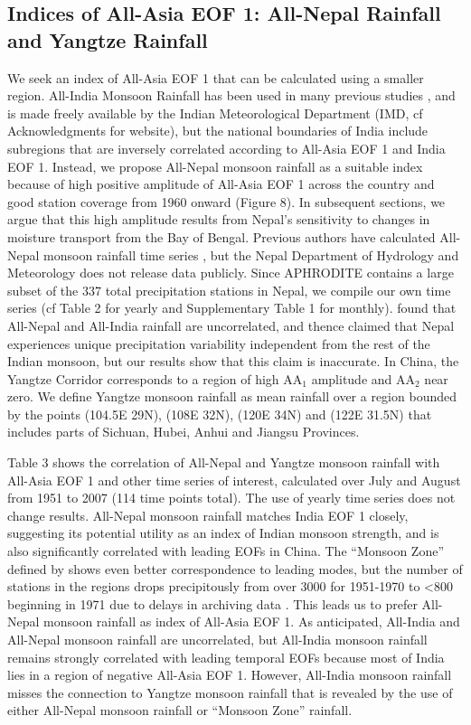 \documentclass[12pt]{article}
\begin{document}
 \subsection{Indices of All-Asia EOF 1: All-Nepal Rainfall and Yangtze Rainfall}
   
	We seek an index of All-Asia EOF 1 that can be calculated using a smaller region. All-India Monsoon Rainfall has been used in many previous studies \citep{Parthasarathy1994}, and is made freely available by the Indian Meteorological Department (IMD, cf Acknowledgments for website), but the national boundaries of India include subregions that are inversely correlated according to All-Asia EOF 1 and India EOF 1. Instead, we propose All-Nepal monsoon rainfall as a suitable index because of high positive amplitude of All-Asia EOF 1 across the country and good station coverage from 1960 onward (Figure 8). In subsequent sections, we argue that this high amplitude results from Nepal's sensitivity to changes in moisture transport from the Bay of Bengal. Previous authors have calculated All-Nepal monsoon rainfall time series \citep{Kansakar2004}, but the Nepal Department of Hydrology and Meteorology does not release data publicly. Since APHRODITE contains a large subset of the 337 total precipitation stations in Nepal, we compile our own time series (cf Table 2 for yearly and Supplementary Table 1 for monthly). \cite{Wang2012} found that All-Nepal and All-India rainfall are uncorrelated, and thence claimed that Nepal experiences unique precipitation variability independent from the rest of the Indian monsoon, but our results show that this claim is inaccurate. In China, the Yangtze Corridor corresponds to a region of high AA$_1$ amplitude and AA$_2$ near zero. We define Yangtze monsoon rainfall as mean rainfall over a region bounded by the points (104.5\textdegree E 29\textdegree N), (108\textdegree E 32\textdegree N), (120\textdegree E 34\textdegree N) and (122\textdegree E 31.5\textdegree N) that includes parts of Sichuan, Hubei, Anhui and Jiangsu Provinces.
	
	Table 3 shows the correlation of All-Nepal and Yangtze monsoon rainfall with All-Asia EOF 1 and other time series of interest, calculated over July and August from 1951 to 2007 (114 time points total). The use of yearly time series does not change results. All-Nepal monsoon rainfall matches India EOF 1 closely, suggesting its potential utility as an index of Indian monsoon strength, and is also significantly correlated with leading EOFs in China. The ``Monsoon Zone'' defined by \cite{Gadgil2003} shows even better correspondence to leading modes, but the number of stations in the regions drops precipitously from over 3000 for 1951-1970 to \textless800 beginning in 1971 due to delays in archiving data \citep{Rajeevan2006}. This leads us to prefer All-Nepal monsoon rainfall as index of All-Asia EOF 1. As anticipated, All-India and All-Nepal monsoon rainfall are uncorrelated, but All-India monsoon rainfall remains strongly correlated with leading temporal EOFs because most of India lies in a region of negative All-Asia EOF 1. However, All-India monsoon rainfall misses the connection to Yangtze monsoon rainfall that is revealed by the use of either All-Nepal monsoon rainfall or ``Monsoon Zone'' rainfall.
	
\end{document}
